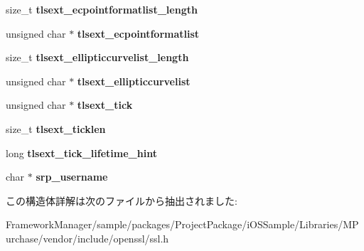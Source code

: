 \begin{DoxyCompactItemize}
\item 
\hypertarget{structssl__session__st_a68fdb9481f7593215ad42878c84871ba}{}size\+\_\+t {\bfseries tlsext\+\_\+ecpointformatlist\+\_\+length}\label{structssl__session__st_a68fdb9481f7593215ad42878c84871ba}

\item 
\hypertarget{structssl__session__st_a0fc2f529f666041f328e849f144e0269}{}unsigned char $\ast$ {\bfseries tlsext\+\_\+ecpointformatlist}\label{structssl__session__st_a0fc2f529f666041f328e849f144e0269}

\item 
\hypertarget{structssl__session__st_a848919a20017cf2a1719d68f2c2ab5aa}{}size\+\_\+t {\bfseries tlsext\+\_\+ellipticcurvelist\+\_\+length}\label{structssl__session__st_a848919a20017cf2a1719d68f2c2ab5aa}

\item 
\hypertarget{structssl__session__st_a451da4196b8221f057c1eed1b92375ce}{}unsigned char $\ast$ {\bfseries tlsext\+\_\+ellipticcurvelist}\label{structssl__session__st_a451da4196b8221f057c1eed1b92375ce}

\item 
\hypertarget{structssl__session__st_a061e6eca821a577ac647c1990ad8abb4}{}unsigned char $\ast$ {\bfseries tlsext\+\_\+tick}\label{structssl__session__st_a061e6eca821a577ac647c1990ad8abb4}

\item 
\hypertarget{structssl__session__st_a8858f901b65590fa8a077c2ef6f8aef1}{}size\+\_\+t {\bfseries tlsext\+\_\+ticklen}\label{structssl__session__st_a8858f901b65590fa8a077c2ef6f8aef1}

\item 
\hypertarget{structssl__session__st_a8c4421410ed55e716ab61e143f636f24}{}long {\bfseries tlsext\+\_\+tick\+\_\+lifetime\+\_\+hint}\label{structssl__session__st_a8c4421410ed55e716ab61e143f636f24}

\item 
\hypertarget{structssl__session__st_a8b6d3960cbed3af15e739eade86e42c9}{}char $\ast$ {\bfseries srp\+\_\+username}\label{structssl__session__st_a8b6d3960cbed3af15e739eade86e42c9}

\end{DoxyCompactItemize}


この構造体詳解は次のファイルから抽出されました\+:\begin{DoxyCompactItemize}
\item 
Framework\+Manager/sample/packages/\+Project\+Package/i\+O\+S\+Sample/\+Libraries/\+M\+Purchase/vendor/include/openssl/ssl.\+h\end{DoxyCompactItemize}
